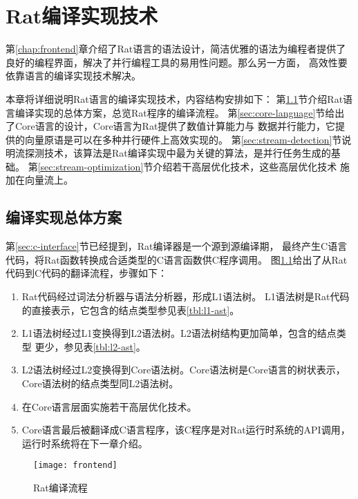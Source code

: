 \chapter{Rat编译实现技术}\label{chap:compiler}
第\ref{chap:frontend}章介绍了Rat语言的语法设计，简洁优雅的语法为编程者提供了
良好的编程界面，解决了并行编程工具的易用性问题。那么另一方面，
高效性要依靠语言的编译实现技术解决。

本章将详细说明Rat语言的编译实现技术，内容结构安排如下：
第\ref{sec:compiler-overview}节介绍Rat语言编译实现的总体方案，总览Rat程序的编译流程。
第\ref{sec:core-language}节给出了Core语言的设计，Core语言为Rat提供了数值计算能力与
数据并行能力，它提供的向量原语是可以在多种并行硬件上高效实现的。
第\ref{sec:stream-detection}节说明流探测技术，该算法是Rat编译实现中最为关键的算法，是并行任务生成的基础。
第\ref{sec:stream-optimization}节介绍若干高层优化技术，这些高层优化技术
施加在向量流上。

\section{编译实现总体方案}\label{sec:compiler-overview}
第\ref{sec:c-interface}节已经提到，Rat编译器是一个源到源编译期，
最终产生C语言代码，将Rat函数转换成合适类型的C语言函数供C程序调用。
图\ref{fig:frontend}给出了从Rat代码到C代码的翻译流程，步骤如下：
\begin{enumerate}
  \item Rat代码经过词法分析器与语法分析器，形成L1语法树。
    L1语法树是Rat代码的直接表示，它包含的结点类型参见表\ref{tbl:l1-ast}。
  \item L1语法树经过L1变换得到L2语法树。L2语法树结构更加简单，包含的结点类型
    更少，参见表\ref{tbl:l2-ast}。
  \item L2语法树经过L2变换得到Core语法树。Core语法树是Core语言的树状表示，
    Core语法树的结点类型同L2语法树。
  \item 在Core语言层面实施若干高层优化技术。
  \item Core语言最后被翻译成C语言程序，该C程序是对Rat运行时系统的API调用，
    运行时系统将在下一章介绍。
\end{enumerate}
\begin{figure}[tbh]
  \centering
  \texttt{[image: frontend]}
  \caption{Rat编译流程}
  \label{fig:frontend}
\end{figure}

